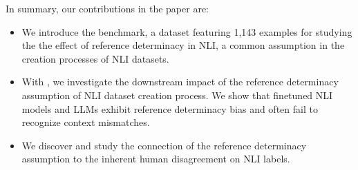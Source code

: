 In summary, our contributions in the paper are: 
\begin{itemize}[leftmargin=*, itemsep=0em]
    \item We introduce the \datasetname benchmark, a dataset featuring 1,143 examples for studying the the effect of reference determinacy in NLI, a common assumption in the creation processes of NLI datasets.  
    \item With \datasetname, we investigate the downstream impact of the reference determinacy assumption of NLI dataset creation process. We show that finetuned NLI models and LLMs exhibit reference determinacy bias and often fail to recognize context mismatches.
    \item We discover and study the connection of the reference determinacy assumption to the inherent human disagreement on NLI labels.  
\end{itemize}






